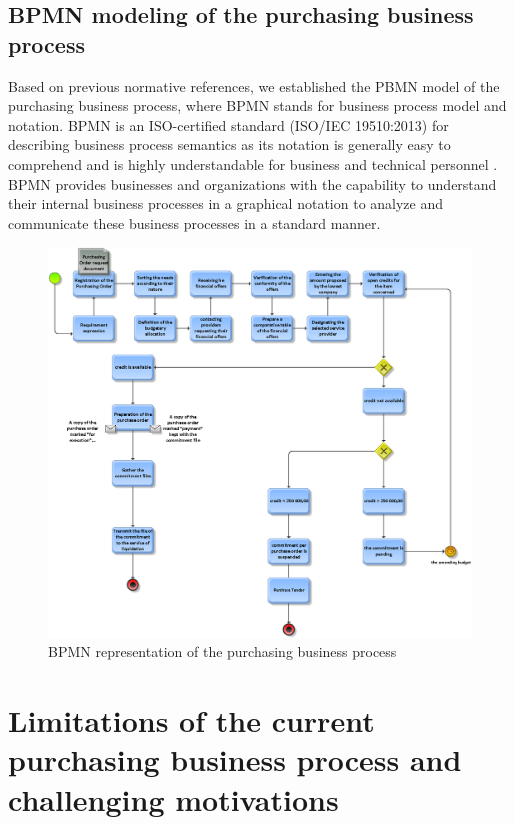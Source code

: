 \documentclass[preprint,3p,onecolumn]{elsarticle}
\begin{document}
\subsection{BPMN modeling of the purchasing business process}
Based on previous normative references, we established the PBMN model \citep{white2004introduction} of the purchasing business process, where BPMN stands for business process model and notation. BPMN is an ISO-certified standard (ISO/IEC 19510:2013) for describing business process semantics as its notation is generally easy to comprehend and is highly understandable for business and technical personnel \citep{ritter2011building}. BPMN provides businesses and organizations with the capability to understand their internal business processes in a graphical notation to analyze and communicate these business processes in a standard manner.

\begin{figure}[H]
\centering
\includegraphics[scale=.3]{bpmn}
\caption{BPMN representation of the purchasing business process}
\label{bpmn_model}
\end{figure}
\clearpage

\section{Limitations of the current purchasing business process and challenging motivations}
\end{document}
